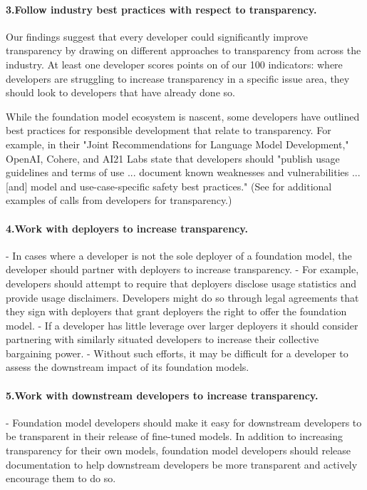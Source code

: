 \documentclass[screen, authorversion, acmsmall]{acmart}
\begin{document}
\paragraph{3.\phantom{X}Follow industry best practices with respect to transparency.}
\begin{myitemize}
\item Our findings suggest that every developer could significantly improve transparency by drawing on different approaches to transparency from across the industry. 
At least one developer scores points on \numfeasible of our 100 indicators: where developers are struggling to increase transparency in a specific issue area, they should look to developers that have already done so.
\item While the foundation model ecosystem is nascent, some developers have outlined best practices for responsible development that relate to transparency. For example, in their "Joint Recommendations for Language Model Development," OpenAI, Cohere, and AI21 Labs state that developers should "publish usage guidelines and terms of use ... document known weaknesses and vulnerabilities ... [and] model and use-case-specific safety best practices." (See  for additional examples of calls from developers for transparency.)
\end{myitemize}
\paragraph{4.\phantom{X}Work with deployers to increase transparency.} 
-  In cases where a developer is not the sole deployer of a foundation model, the developer should partner with deployers to increase transparency.
- For example, developers should attempt to require that deployers disclose usage statistics and provide usage disclaimers. Developers might do so through legal agreements that they sign with deployers that grant deployers the right to offer the foundation model.
- If a developer has little leverage over larger deployers it should consider partnering with similarly situated developers to increase their collective bargaining power.
- Without such efforts, it may be difficult for a developer to assess the downstream impact of its foundation models.
\paragraph{5.\phantom{X}Work with downstream developers to increase transparency.} 
-  Foundation model developers should make it easy for downstream developers to be transparent in their release of fine-tuned models. In addition to increasing transparency for their own models, foundation model developers should release documentation to help downstream developers be more transparent and actively encourage them to do so.
\end{document}
